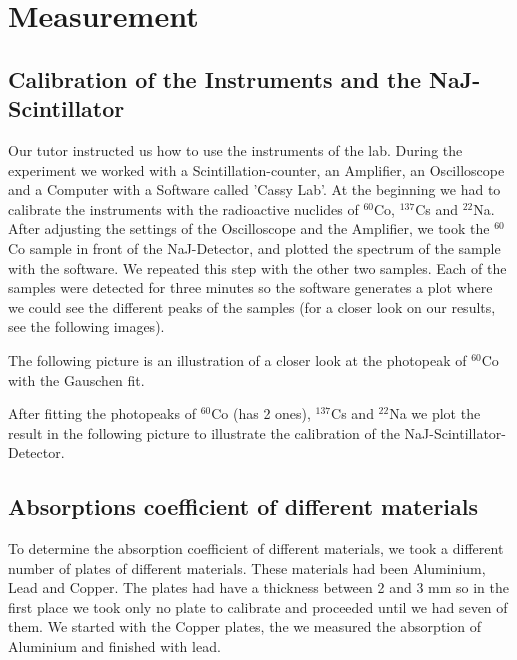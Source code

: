\section{Measurement}

\subsection{Calibration of the Instruments and the NaJ-Scintillator}
Our tutor instructed us how to use the instruments of the lab. During the experiment we worked with a Scintillation-counter, an Amplifier, an Oscilloscope and a Computer with a Software called 'Cassy Lab'. At the beginning we had to calibrate the instruments with the radioactive nuclides of $^{60}$Co, $^{137}$Cs and $^{22}$Na. After adjusting the settings of the Oscilloscope and the Amplifier, we took the $^{60}$Co sample in front of the NaJ-Detector, and plotted the spectrum of the sample with the software. We repeated this step with the other two samples. Each of the samples were detected for three minutes so the software generates a plot where we could see the different peaks of the samples (for a closer look on our results, see the following images).


The following picture is an illustration of a closer look at the photopeak of $^{60}$Co with the Gauschen fit.


After fitting the photopeaks of $^{60}$Co (has 2 ones), $^{137}$Cs and $^{22}$Na we plot the result in the following picture to illustrate the calibration of the NaJ-Scintillator-Detector.

\subsection{Absorptions coefficient of different materials}
To determine the absorption coefficient of different materials, we took a different number of plates of different materials. These materials had been Aluminium, Lead and Copper. The plates had have a thickness between 2 and 3 mm so in the first place we took only no plate to calibrate and proceeded until we had seven of them. We started with the Copper plates, the we measured the absorption of Aluminium and finished with lead.

